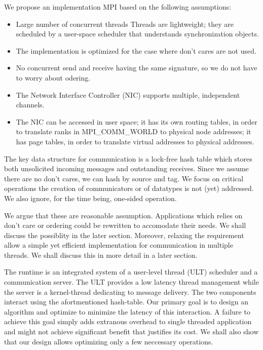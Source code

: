 \documentclass[11pt]{article}
\begin{document}
We propose an implementation MPI based on the following assumptions:
\begin{itemize}
  \item Large number of concurrent threads Threads are lightweight; they are
    scheduled by a user-space scheduler that understands synchronization
    objects.
  \item The implementation is optimized for the case where don't cares are not used.
  \item No concurrent send and receive having the same signature, so we do not have to worry about odering.
  \item The Network Interface Controller (NIC) supports multiple, independent channels.
  \item The NIC can be accessed in user space; it has its own routing tables,
    in order to translate ranks in MPI\_COMM\_WORLD to physical node addresses;
    it has page tables, in order to translate virtual addresses to physical
    addresses.
\end{itemize}

The key data structure for communication is a lock-free hash table which stores
both unsolicited incoming messages and outstanding receives. Since we assume
there are no don't cares, we can hash by source and tag. We focus on critical
operations the creation of communicators or of datatypes is not (yet)
addressed. We also ignore, for the time being, one-sided operation.

We argue that these are reasonable assumption.  Applications which relies on
don't care or ordering could be rewritten to accomodate their needs. We shall
discuss the possiblity in the later section. Moreover, relaxing the requirement
allow a simple yet efficient implementation for communication in multiple
threads. We shall discuss this in more detail in a later section.

The runtime is an integrated system of a user-level thread (ULT) scheduler and
a communication server. The ULT provides a low latency thread management while
the server is a kernel-thread dedicating to message delivery. The two
components interact using the afortmentioned hash-table.  Our primary goal is
to design an algorithm and optimize to minimize the latency of this
interaction. A failure to achieve this goal simply adds extranous overhead to
single threaded application and might not achieve significant benefit that
justifies its cost. We shall also show that our design allows optimizing only a
few neccessary operations.
\end{document}
